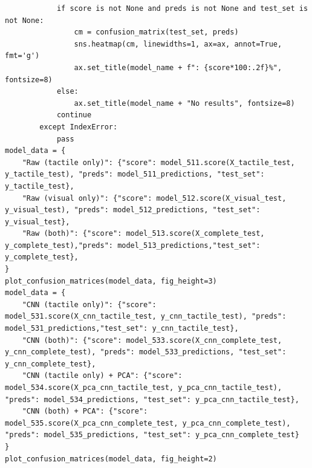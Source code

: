 \documentclass[11pt, a4paper]{report}
\begin{document}
\begin{lstlisting}
            if score is not None and preds is not None and test_set is not None:
                cm = confusion_matrix(test_set, preds)
                sns.heatmap(cm, linewidths=1, ax=ax, annot=True, fmt='g')
                ax.set_title(model_name + f": {score*100:.2f}%", fontsize=8)
            else:
                ax.set_title(model_name + "No results", fontsize=8)
            continue
        except IndexError:
            pass
model_data = {
    "Raw (tactile only)": {"score": model_511.score(X_tactile_test, y_tactile_test), "preds": model_511_predictions, "test_set": y_tactile_test},
    "Raw (visual only)": {"score": model_512.score(X_visual_test, y_visual_test), "preds": model_512_predictions, "test_set": y_visual_test},
    "Raw (both)": {"score": model_513.score(X_complete_test, y_complete_test),"preds": model_513_predictions,"test_set": y_complete_test},
}
plot_confusion_matrices(model_data, fig_height=3)
model_data = {
    "CNN (tactile only)": {"score": model_531.score(X_cnn_tactile_test, y_cnn_tactile_test), "preds": model_531_predictions,"test_set": y_cnn_tactile_test},
    "CNN (both)": {"score": model_533.score(X_cnn_complete_test, y_cnn_complete_test), "preds": model_533_predictions, "test_set": y_cnn_complete_test},
    "CNN (tactile only) + PCA": {"score": model_534.score(X_pca_cnn_tactile_test, y_pca_cnn_tactile_test), "preds": model_534_predictions, "test_set": y_pca_cnn_tactile_test},
    "CNN (both) + PCA": {"score": model_535.score(X_pca_cnn_complete_test, y_pca_cnn_complete_test), "preds": model_535_predictions, "test_set": y_pca_cnn_complete_test}
}
plot_confusion_matrices(model_data, fig_height=2)
\end{lstlisting}
\end{document}
